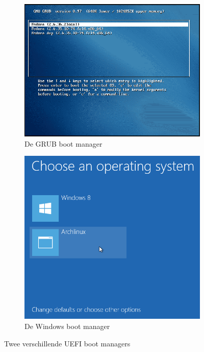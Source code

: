\begin{figure}
\centering
\begin{subfigure}{.5\textwidth}
  \centering
  \includegraphics[width=.95\linewidth]{images/grubbl.png}
  \caption{De GRUB boot manager}
  \label{fig:grubnl}
\end{subfigure}%
\begin{subfigure}{.5\textwidth}
  \centering
  \includegraphics[width=.95\linewidth]{images/wbl.png}
  \caption{De Windows boot manager}
  \label{fig:wbl}
\end{subfigure}
\caption{Twee verschillende UEFI boot managers}
\label{fig:bootloaders}
\end{figure}

